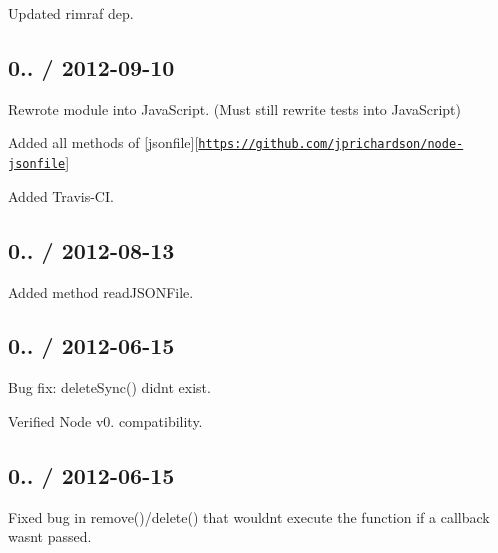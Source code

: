 \begin{DoxyItemize}
\item Updated {\ttfamily rimraf} dep.
\end{DoxyItemize}

\subsection*{0.. / 2012-\/09-\/10 }


\begin{DoxyItemize}
\item Rewrote module into Java\+Script. (Must still rewrite tests into Java\+Script)
\item Added all methods of \mbox{[}jsonfile\mbox{]}\mbox{[}\href{https://github.com/jprichardson/node-jsonfile}{\tt https\+://github.\+com/jprichardson/node-\/jsonfile}\mbox{]}
\item Added Travis-\/\+CI.
\end{DoxyItemize}

\subsection*{0.. / 2012-\/08-\/13 }


\begin{DoxyItemize}
\item Added method {\ttfamily read\+J\+S\+O\+N\+File}.
\end{DoxyItemize}

\subsection*{0.. / 2012-\/06-\/15 }


\begin{DoxyItemize}
\item Bug fix\+: {\ttfamily delete\+Sync()} didn\textquotesingle{}t exist.
\item Verified Node v0. compatibility.
\end{DoxyItemize}

\subsection*{0.. / 2012-\/06-\/15 }


\begin{DoxyItemize}
\item Fixed bug in {\ttfamily remove()}/{\ttfamily delete()} that wouldn\textquotesingle{}t execute the function if a callback wasn\textquotesingle{}t passed.
\end{DoxyItemize}

